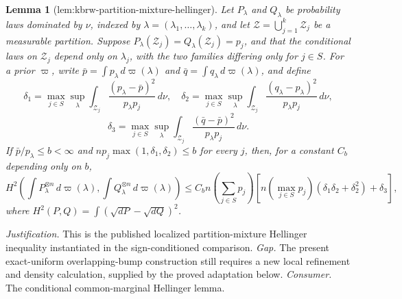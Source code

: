 \documentclass{article}
\newtheorem{lemma}{Lemma}
\begin{document}
\begin{lemma}[lem:kbrw-partition-mixture-hellinger]\label{lem:kbrw-partition-mixture-hellinger}
Let \(P_\lambda\) and \(Q_\lambda\) be probability laws dominated by \(\nu\), indexed by \(\lambda=(\lambda_1,\ldots,\lambda_k)\), and let \(\mathcal Z=\bigcup_{j=1}^k\mathcal Z_j\) be a measurable partition.  Suppose \(P_\lambda(\mathcal Z_j)=Q_\lambda(\mathcal Z_j)=p_j\), and that the conditional laws on \(\mathcal Z_j\) depend only on \(\lambda_j\), with the two families differing only for \(j\in S\).  For a prior \(\varpi\), write \(\bar p=\int p_\lambda\,d\varpi(\lambda)\) and \(\bar q=\int q_\lambda\,d\varpi(\lambda)\), and define
\[
 \delta_1=\max_{j\in S}\sup_\lambda\int_{\mathcal Z_j}
 \frac{(p_\lambda-\bar p)^2}{p_\lambda p_j}\,d\nu,
 \quad
 \delta_2=\max_{j\in S}\sup_\lambda\int_{\mathcal Z_j}
 \frac{(q_\lambda-p_\lambda)^2}{p_\lambda p_j}\,d\nu,
\]
\[
 \delta_3=\max_{j\in S}\sup_\lambda\int_{\mathcal Z_j}
 \frac{(\bar q-\bar p)^2}{p_\lambda p_j}\,d\nu.
\]
If \(\bar p/p_\lambda\le b<\infty\) and \(np_j\max(1,\delta_1,\delta_2)\le b\) for every \(j\), then, for a constant \(C_b\) depending only on \(b\),
\[
 H^2\!\left(\int P_\lambda^{\otimes n}\,d\varpi(\lambda),
              \int Q_\lambda^{\otimes n}\,d\varpi(\lambda)\right)
 \le C_b n\left(\sum_{j\in S}p_j\right)
 \left[n\left(\max_{j\in S}p_j\right)
       (\delta_1\delta_2+\delta_2^2)+\delta_3\right],
\]
where \(H^2(P,Q)=\int(\sqrt{dP}-\sqrt{dQ})^2\).
\end{lemma}
\par\smallskip\noindent \textit{Justification.} This is the published localized partition-mixture Hellinger inequality instantiated in the sign-conditioned comparison. \textit{Gap.} The present exact-uniform overlapping-bump construction still requires a new local refinement and density calculation, supplied by the proved adaptation below. \textit{Consumer.} The conditional common-marginal Hellinger lemma.
\end{document}
